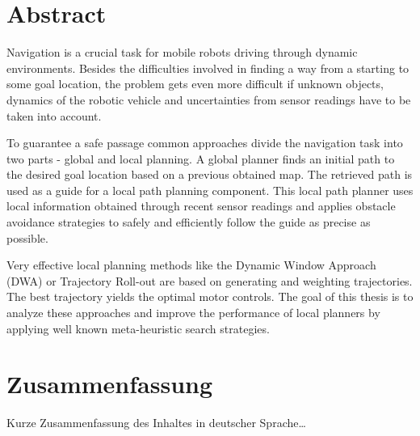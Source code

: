\begingroup
\let\clearpage\relax
\let\cleardoublepage\relax
\let\cleardoublepage\relax

\chapter*{Abstract}
Navigation is a crucial task for mobile robots driving through dynamic environments.
Besides the difficulties involved in finding a way from a starting to some goal location, the problem gets even more difficult if unknown objects, dynamics of the robotic vehicle and uncertainties from sensor readings have to be taken into account.

To guarantee a safe passage common approaches divide the navigation task into two parts - global and local planning.
A global planner finds an initial path to the desired goal location based on a previous obtained map. The retrieved path is used as a guide for a local path planning component.
This local path planner uses local information obtained through recent sensor readings and applies obstacle avoidance strategies to safely and efficiently follow the guide as precise as possible. 

Very effective local planning methods like the Dynamic Window Approach (DWA) or Trajectory Roll-out are based on generating and weighting trajectories.
The best trajectory yields the optimal motor controls.
The goal of this thesis is to analyze these approaches and improve the performance of local planners by applying well known meta-heuristic search strategies. 





\vfill
\newpage

\chapter*{Zusammenfassung}
Kurze Zusammenfassung des Inhaltes in deutscher Sprache\dots


\endgroup			

\vfill